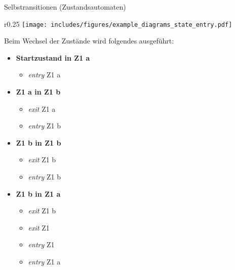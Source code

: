 \begin{example}{Selbstransitionen (Zustandsautomaten)}
    \begin{wrapfigure}{r}{0.25\textwidth}
        \centering
        \texttt{[image: includes/figures/example\_diagrams\_state\_entry.pdf]}
    \end{wrapfigure}
    Beim Wechsel der Zustände wird folgendes ausgeführt:
    \begin{itemize}
        \item \textbf{Startzustand in Z1 a}
              \begin{itemize}
                  \item \emph{entry} Z1 a
              \end{itemize}
        \item \textbf{Z1 a in Z1 b}
              \begin{itemize}
                  \item \emph{exit} Z1 a
                  \item \emph{entry} Z1 b
              \end{itemize}
        \item \textbf{Z1 b in Z1 b}
              \begin{itemize}
                  \item \emph{exit} Z1 b
                  \item \emph{entry} Z1 b
              \end{itemize}
        \item \textbf{Z1 b in Z1 a}
              \begin{itemize}
                  \item \emph{exit} Z1 b
                  \item \emph{exit} Z1
                  \item \emph{entry} Z1
                  \item \emph{entry} Z1 a
              \end{itemize}
    \end{itemize}
\end{example}

